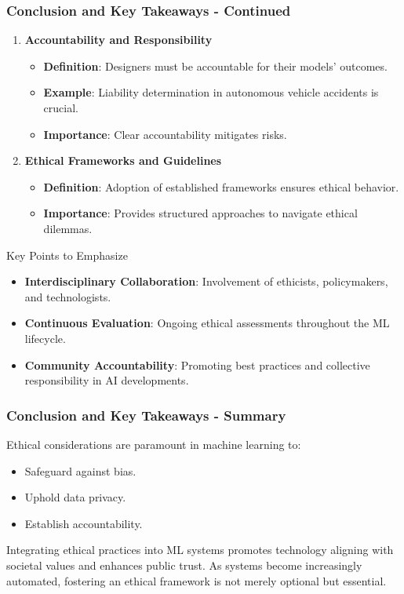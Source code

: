 \documentclass[aspectratio=169]{beamer}
\begin{document}
\begin{frame}[fragile]
  \frametitle{Conclusion and Key Takeaways - Continued}
  \begin{enumerate}[resume]
    \item \textbf{Accountability and Responsibility}
      \begin{itemize}
        \item \textbf{Definition}: Designers must be accountable for their models' outcomes.
        \item \textbf{Example}: Liability determination in autonomous vehicle accidents is crucial.
        \item \textbf{Importance}: Clear accountability mitigates risks.
      \end{itemize}
    
    \item \textbf{Ethical Frameworks and Guidelines}
      \begin{itemize}
        \item \textbf{Definition}: Adoption of established frameworks ensures ethical behavior.
        \item \textbf{Importance}: Provides structured approaches to navigate ethical dilemmas.
      \end{itemize}
  \end{enumerate}
  
  \begin{block}{Key Points to Emphasize}
    \begin{itemize}
      \item \textbf{Interdisciplinary Collaboration}: Involvement of ethicists, policymakers, and technologists.
      \item \textbf{Continuous Evaluation}: Ongoing ethical assessments throughout the ML lifecycle.
      \item \textbf{Community Accountability}: Promoting best practices and collective responsibility in AI developments.
    \end{itemize}
  \end{block}
\end{frame}

\begin{frame}[fragile]
  \frametitle{Conclusion and Key Takeaways - Summary}
  Ethical considerations are paramount in machine learning to:
  \begin{itemize}
    \item Safeguard against bias.
    \item Uphold data privacy.
    \item Establish accountability.
  \end{itemize}
  
  Integrating ethical practices into ML systems promotes technology aligning with societal values and enhances public trust. As systems become increasingly automated, fostering an ethical framework is not merely optional but essential.
\end{frame}
\end{document}
